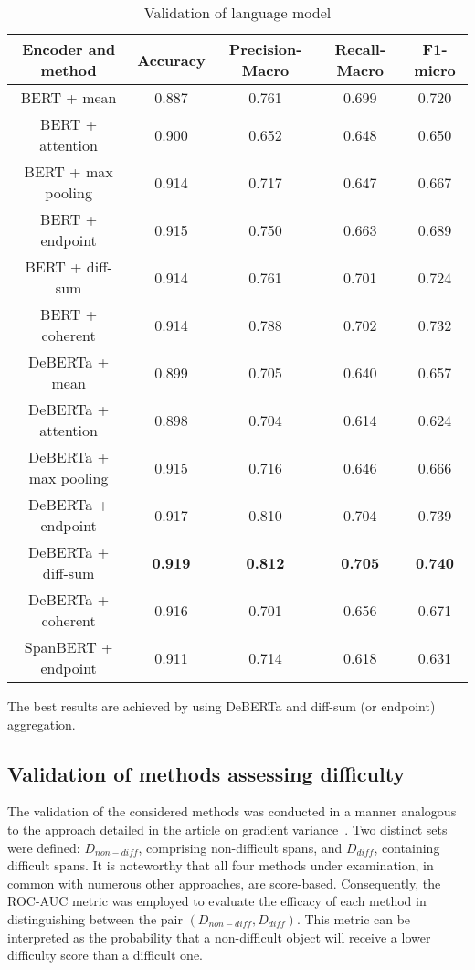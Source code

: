 \documentclass{article}
\begin{document}
\begin{table}[!htb]
    \centering
    \caption{Validation of language model}\label{tab:val}
    \begin{tabular}{|c|c|c|c|c|} 
        \hline
        Encoder and method & Accuracy & Precision-Macro & Recall-Macro & F1-micro \\ \hline
        BERT + mean & 0.887	 & 0.761 & 0.699 & 0.720 \\ \hline	 
        BERT + attention & 0.900 & 0.652 & 0.648 & 0.650 \\ \hline
        BERT + max pooling & 0.914&0.717&0.647&0.667 \\ \hline
        BERT + endpoint & 0.915&0.750&0.663&0.689\\ \hline
        BERT + diff-sum &0.914&0.761&0.701&0.724\\ \hline
        BERT + coherent &0.914&0.788&0.702&0.732\\ \hline
        DeBERTa + mean &0.899&0.705&0.640&0.657\\ \hline
        DeBERTa + attention &0.898&0.704&0.614&0.624\\ \hline
        DeBERTa + max pooling &0.915&0.716&0.646&0.666\\ \hline
        DeBERTa + endpoint &0.917&0.810&0.704&0.739\\ \hline
        DeBERTa + diff-sum &\textbf{0.919}&\textbf{0.812}&\textbf{0.705}&\textbf{0.740}\\ \hline
        DeBERTa + coherent &0.916&0.701&0.656&0.671\\ \hline
        SpanBERT + endpoint &0.911&0.714&0.618&0.631\\ \hline
    \end{tabular}
\end{table}

The best results are achieved by using DeBERTa and diff-sum (or endpoint) aggregation.

\subsection{Validation of methods assessing difficulty}


The validation of the considered methods was conducted in a manner analogous to the approach detailed in the article on gradient variance~\cite{agarwal2022estimating}. Two distinct sets were defined: \(D_{non-diff}\), comprising non-difficult spans, and \(D_{diff}\), containing difficult spans. It is noteworthy that all four methods under examination, in common with numerous other approaches, are score-based. Consequently, the ROC-AUC metric was employed to evaluate the efficacy of each method in distinguishing between the pair \((D_{non-diff}, D_{diff})\). This metric can be interpreted as the probability that a non-difficult object will receive a lower difficulty score than a difficult one.
\end{document}
